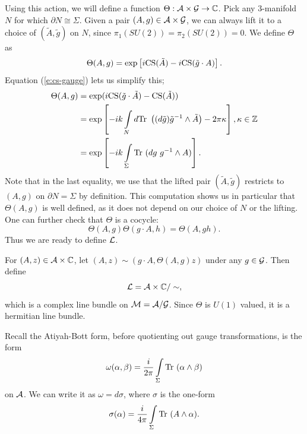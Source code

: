 Using this action, we will define a function $\Theta:\mathcal{A}\times \mathcal{G} \to \mathbb{C}$. Pick any 3-manifold $N$ for which $\partial N \cong \Sigma$. Given a pair $(A,g) \in \mathcal{A}\times\mathcal{G}$, we can always lift it to a choice of $(\tilde{A}, \tilde{g})$ on $N$, since $\pi_1(SU(2)) = \pi_2(SU(2)) = 0$. We define $\Theta$ as
\begin{equation}
\Theta(A,g) = \exp\left[i\text{CS}(\tilde{A}) - i\text{CS}(\tilde{g}\cdot A)\right].
\end{equation}
Equation (\ref{e:cs-gauge}) lets us simplify this;
\begin{align*}
\Theta(A,g) &= \exp(i \text{CS}(\tilde{g}\cdot \tilde{A}) - \text{CS}(\tilde{A}))\\
&= \exp\left[-ik \int\limits_N d\text{Tr }\left((d\tilde{g})\tilde{g}^{-1}\wedge \tilde{A}\right) - 2\pi \kappa\right], \kappa \in \mathbb{Z}\\
&= \exp\left[-ik \int\limits_{\Sigma} \text{Tr }(dg~ g^{-1}\wedge A)\right].
\end{align*}
Note that in the last equality, we use that the lifted pair $(\tilde{A},\tilde{g})$ restricts to $(A,g)$ on $\partial N = \Sigma$ by definition. This computation shows us in particular that $\Theta(A,g)$ is well defined, as it does not depend on our choice of $N$ or the lifting. One can further check that $\Theta$ is a cocycle:
\begin{equation}
\Theta(A,g)\Theta(g\cdot A, h) = \Theta(A,gh).
\end{equation}
Thus we are ready to define $\mathcal{L}$.
\begin{definition}
	\label{d:cs-bundle}
	For $(A,z)\in \mathcal{A}\times \mathbb{C}$, let $(A,z)\sim (g\cdot A, \Theta(A,g)z)$ under any $g\in \mathcal{G}$. Then define
	\begin{equation}
	\mathcal{L} = \mathcal{A}\times \mathbb{C} / \sim,
	\end{equation}
	which is a complex line bundle on $\mathcal{M} = \mathcal{A}/\mathcal{G}$. Since $\Theta$ is $U(1)$ valued, it is a hermitian line bundle.
\end{definition}
Recall the Atiyah-Bott form, before quotienting out gauge transformations, is the form 
\begin{equation}
\omega(\alpha,\beta) = \frac{i}{2\pi}\int\limits_\Sigma \text{Tr }(\alpha\wedge \beta)
\end{equation}
on $\mathcal{A}$. We can write it as $\omega = d\sigma$, where $\sigma$ is the one-form
\begin{equation}
\sigma(\alpha) = \frac{i}{4\pi}\int\limits_\Sigma \text{Tr }(A\wedge \alpha).
\end{equation}
